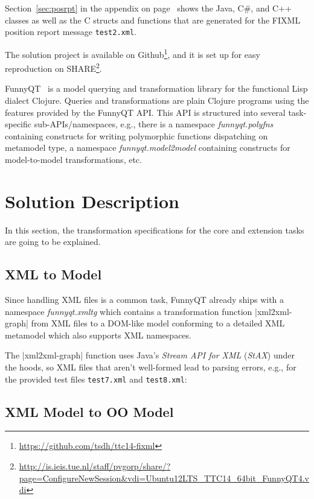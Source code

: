 \documentclass[submission]{eptcs}
\newcommand{\code}{\clojureinline}
\begin{document}
Section~\ref{sec:posrpt} in the appendix on page~\pageref{sec:posrpt} shows the
Java, C\#, and C++ classes as well as the C structs and functions that are
generated for the FIXML position report message \texttt{test2.xml}.

The solution project is available on
Github\footnote{\url{https://github.com/tsdh/ttc14-fixml}}, and it is set up
for easy reproduction on
SHARE\footnote{\url{http://is.ieis.tue.nl/staff/pvgorp/share/?page=ConfigureNewSession&vdi=Ubuntu12LTS_TTC14_64bit_FunnyQT4.vdi}}.

FunnyQT~\cite{Horn2013MQWFQ} is a model querying and transformation library for
the functional Lisp dialect Clojure.  Queries and transformations are plain
Clojure programs using the features provided by the FunnyQT API.  This API is
structured into several task-specific sub-APIs/namespaces, e.g., there is a
namespace \emph{funnyqt.polyfns} containing constructs for writing polymorphic
functions dispatching on metamodel type, a namespace \emph{funnyqt.model2model}
containing constructs for model-to-model transformations, etc.


\section{Solution Description}
\label{sec:solution-description}

In this section, the transformation specifications for the core and extension
tasks are going to be explained.

\subsection{XML to Model}
\label{sec:xml2model}

Since handling XML files is a common task, FunnyQT already ships with a
namespace \emph{funnyqt.xmltg} which contains a transformation function
\code|xml2xml-graph| from XML files to a DOM-like model conforming to a
detailed XML metamodel which also supports XML namespaces.

The \code|xml2xml-graph| function uses Java's \emph{Stream API for XML}
(\emph{StAX}) under the hoods, so XML files that aren't well-formed lead to
parsing errors, e.g., for the provided test files \texttt{test7.xml} and
\texttt{test8.xml}:


\subsection{XML Model to OO Model}
\label{sec:xml-to-oo}
\end{document}
